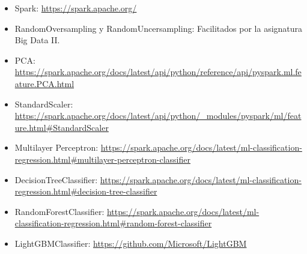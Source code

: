 \documentclass[11pt]{article}
\begin{document}
\begin{itemize}
	\item Spark: \href{https://spark.apache.org/}{https://spark.apache.org/}
	\item RandomOversampling y RandomUncersampling: Facilitados por la asignatura Big Data II.
	\item PCA: \href{https://spark.apache.org/docs/latest/api/python/reference/api/pyspark.ml.feature.PCA.html}{https://spark.apache.org/docs/latest/api/python/reference/api/pyspark.ml.feature.PCA.html}
	\item StandardScaler: \href{https://spark.apache.org/docs/latest/api/python/_modules/pyspark/ml/feature.html#StandardScaler}{https://spark.apache.org/docs/latest/api/python/_modules/pyspark/ml/feature.html#StandardScaler}
	\item Multilayer Perceptron: \href{https://spark.apache.org/docs/latest/ml-classification-regression.html#multilayer-perceptron-classifier}{https://spark.apache.org/docs/latest/ml-classification-regression.html#multilayer-perceptron-classifier}
	\item DecisionTreeClassifier: \href{https://spark.apache.org/docs/latest/ml-classification-regression.html#decision-tree-classifier}{https://spark.apache.org/docs/latest/ml-classification-regression.html#decision-tree-classifier}
	\item RandomForestClassifier: \href{https://spark.apache.org/docs/latest/ml-classification-regression.html#random-forest-classifier}{https://spark.apache.org/docs/latest/ml-classification-regression.html#random-forest-classifier}
	\item LightGBMClassifier: \href{https://github.com/Microsoft/LightGBM}{https://github.com/Microsoft/LightGBM}
\end{itemize}
\end{document}

